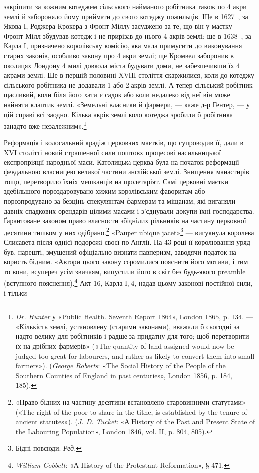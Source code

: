 \parcont{}  %
закріпити за кожним котеджем сільського найманого робітника
також по 4 акри землі й забороняло йому приймати до свого
котеджу пожильців. Ще в 1627~, за Якова І, Роджера Крокера
з Фронт-Міллу засуджено за те, що він у маєтку Фронт-Мілл
збудував котедж і не прирізав до нього 4 акрів землі; ще в 1638~,
за Карла І, призначено королівську комісію, яка мала примусити
до виконування старих законів, особливо закону про 4 акри
землі; ще Кромвел заборонив в околицях Лондону 4 милі довкола
міста будувати доми, не забезпечивши їх 4 акрами землі. Ще в
першій половині XVIIІ століття скаржилися, коли до котеджу
сільського робітника не додавали 1 або 2 акрів землі. А тепер
сільський робітник щасливий, коли біля його хати є садок або
коли недалеко від неї він може найняти клаптик землі. «Земельні
власники й фармери, — каже д-р Гентер, — у цій справі всі заодно.
Кілька акрів землі коло котеджа зробили б робітника
занадто вже незалежним».\footnote{
\emph{Dr. Hunter} у «Public Health. Seventh Report 1864», London 1865,
p. 134. — «Кількість землі, установлену (старими законами), вважали б
сьогодні за надто велику для робітників і радше за придатну для того;
щоб перетворити їх на дрібних фармерів» («The quantity оf land assigned
would now be judged too great for labourers, and rather as likely to
convert them into small farmers»). (\emph{George Roberts}: «The Social History
of the People of the Southern Counties of England in past centuries», London
1856, p. 184, 185).
}

Реформація і колосальний крадіж церковних маєтків, що
супроводив її, дали в XVI столітті новий страшенної сили поштовх
процесові насильницької експропріяції народньої маси.
Католицька церква була на початок реформації февдальною
власницею великої частини англійської землі. Знищення манастирів
тощо, перетворило їхніх мешканців на пролетаріят.
Самі церковні маєтки здебільшого пороздаровувано хижим королівським
фаворитам або порозпродувано за безцінь спекулянтам-фармерам
та міщанам, які виганяли давніх спадкових орендарів
цілими масами і з’єднували докупи їхні господарства. Ґарантоване
законом право власности збіднілих рільників на частину
церковної десятини тишком у них одібрано.\footnote{
«Право бідних на частину десятини встановлено старовинними
статутами» («The right of the poor to share in the tithe, is established by
the tenure of ancient statutes»). (\emph{J. D. Tucket}: «А History of the Past
and Present State of the Labouring Population», London 1846, vol. II,
p. 804, 805).
} «Pauper ubique
jacet»\footnote*{
Бідні повсюди. \emph{Ред.}
} — вигукнула королева Єлисавета після однієї подорожі
своєї по Англії. На 43 році її королювання уряд був, нарешті,
змушений офіціально визнати павперизм, заводячи податок на
користь бідним. «Автори цього закону соромилися пояснити
його мотиви, і тим то вони, всупереч усім звичаям, випустили
його в світ без будь-якого preamble (вступного пояснення).\footnote{
\emph{William Cobbett}: «А History of the Protestant Reformation», § 471.
}
Акт 16, Карла І, 4, надав цьому законові постійної сили, і тільки
\parbreak{}  %
